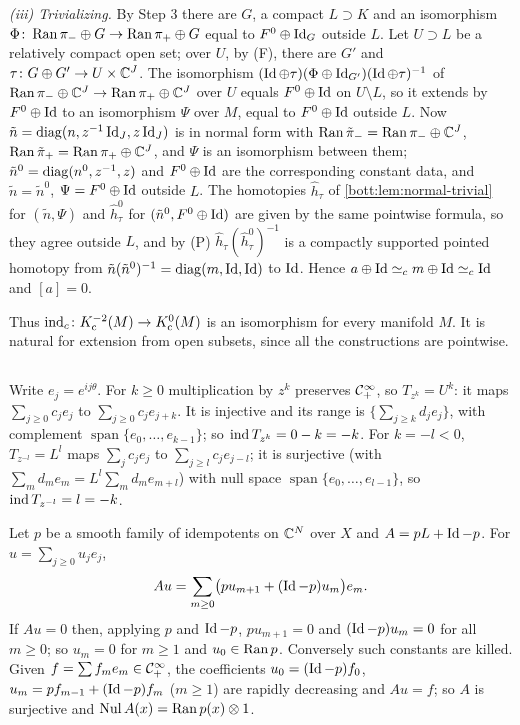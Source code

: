 \emph{(iii) Trivializing.} By Step 3 there are $G$, a compact $L\supset K$ and an
isomorphism $\Phi\colon\operatorname{Ran}\pi_-\oplus G\to\operatorname{Ran}\pi_+\oplus G$ equal to $F^0\oplus\operatorname{Id}_G$
outside $L$. Let $U\supset L$ be a relatively compact open set; over $U$, by (F), there are
$G'$ and $\tau\colon G\oplus G'\to U\times\mathbb{C}^J$. The isomorphism
$(\operatorname{Id}\oplus\tau)(\Phi\oplus\operatorname{Id}_{G'})(\operatorname{Id}\oplus\tau)^{-1}$ of
$\operatorname{Ran}\pi_-\oplus\mathbb{C}^J\to\operatorname{Ran}\pi_+\oplus\mathbb{C}^J$ over $U$ equals $F^0\oplus\operatorname{Id}$ on $U\setminus L$,
so it extends by $F^0\oplus\operatorname{Id}$ to an isomorphism $\Psi$ over $M$, equal to $F^0\oplus\operatorname{Id}$
outside $L$. Now $\tilde n=\operatorname{diag}(n,z^{-1}\operatorname{Id}_J,z\operatorname{Id}_J)$ is in normal form with
$\operatorname{Ran}\tilde\pi_-=\operatorname{Ran}\pi_-\oplus\mathbb{C}^J$, $\operatorname{Ran}\tilde\pi_+=\operatorname{Ran}\pi_+\oplus\mathbb{C}^J$, and $\Psi$ is an
isomorphism between them; $\tilde n^0=\operatorname{diag}(n^0,z^{-1},z)$ and $F^0\oplus\operatorname{Id}$ are the
corresponding constant data, and $\tilde n=\tilde n^0$, $\Psi=F^0\oplus\operatorname{Id}$ outside $L$. The
homotopies $\hat h_\tau$ of \cref{bott:lem:normal-trivial} for $(\tilde n,\Psi)$ and
$\hat h^0_\tau$ for $(\tilde n^0,F^0\oplus\operatorname{Id})$ are given by the same pointwise formula, so
they agree outside $L$, and by (P) $\hat h_\tau(\hat h^0_\tau)^{-1}$ is a compactly supported
pointed homotopy from $\tilde n(\tilde n^0)^{-1}=\operatorname{diag}(m,\operatorname{Id},\operatorname{Id})$ to $\operatorname{Id}$. Hence
$a\oplus\operatorname{Id}\simeq_c m\oplus\operatorname{Id}\simeq_c\operatorname{Id}$ and $[a]=0$.

Thus $\operatorname{ind}_c\colon K_{\mathrm{c}}^{-2}(M)\to K_{\mathrm{c}}^0(M)$ is an isomorphism for every manifold $M$. It is
natural for extension from open subsets, since all the constructions are pointwise.

\subsection*{}
Write $e_j=e^{ij\theta}$. For $k\ge0$ multiplication by $z^k$ preserves $\mathcal{C}^\infty_+$, so
$T_{z^k}=U^k$: it maps $\sum_{j\ge0}c_je_j$ to $\sum_{j\ge0}c_je_{j+k}$. It is injective
and its range is $\{\sum_{j\ge k}d_je_j\}$, with complement $\operatorname{span}\{e_0,\dots,e_{k-1}\}$;
so $\operatorname{ind} T_{z^k}=0-k=-k$. For $k=-l<0$, $T_{z^{-l}}=L^l$ maps $\sum_jc_je_j$ to
$\sum_{j\ge l}c_je_{j-l}$; it is surjective (with
$\sum_md_me_m=L^l\sum_md_me_{m+l}$) with null space $\operatorname{span}\{e_0,\dots,e_{l-1}\}$, so
$\operatorname{ind} T_{z^{-l}}=l=-k$.

Let $p$ be a smooth family of idempotents on $\mathbb{C}^N$ over $X$ and $A=pL+\operatorname{Id}-p$. For
$u=\sum_{j\ge0}u_je_j$,
\begin{equation*}
  Au=\sum_{m\ge0}\bigl(pu_{m+1}+(\operatorname{Id}-p)u_m\bigr)e_m .
\end{equation*}
If $Au=0$ then, applying $p$ and $\operatorname{Id}-p$, $pu_{m+1}=0$ and $(\operatorname{Id}-p)u_m=0$ for all $m\ge0$;
so $u_m=0$ for $m\ge1$ and $u_0\in\operatorname{Ran} p$. Conversely such constants are killed. Given
$f=\sum f_me_m\in\mathcal{C}^\infty_+$, the coefficients $u_0=(\operatorname{Id}-p)f_0$, $u_m=pf_{m-1}+(\operatorname{Id}-p)f_m$ ($m\ge1$)
are rapidly decreasing and $Au=f$; so $A$ is surjective and $\operatorname{Nul} A(x)=\operatorname{Ran} p(x)\otimes1$.

